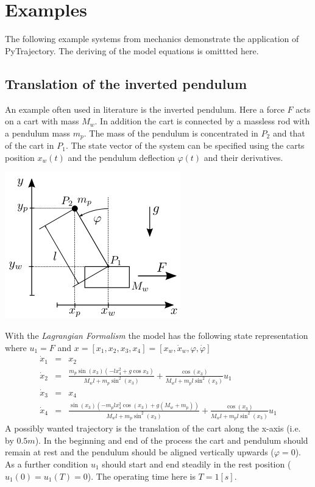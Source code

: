 \documentclass[letterpaper,10pt,english]{sphinxmanual}
\begin{document}
\section{Examples}
\label{guide/examples/index::doc}\label{guide/examples/index:examples}
The following example systems from mechanics demonstrate the application
of PyTrajectory. The deriving of the model equations is omittted here.


\subsection{Translation of the inverted pendulum}
\label{guide/examples/inv_pendulum_trans::doc}\label{guide/examples/inv_pendulum_trans:translation-of-the-inverted-pendulum}
An example often used in literature is the inverted pendulum. Here a
force \(F\) acts on a cart with mass \(M_w\). In addition the
cart is connected by a massless rod with a pendulum mass \(m_p\).
The mass of the pendulum is concentrated in \(P_2\) and that of the
cart in \(P_1\). The state vector of the system can be specified
using the carts position \(x_w(t)\) and the pendulum deflection
\(\varphi(t)\) and their derivatives.

\includegraphics{inv_pendulum.png}

With the \emph{Lagrangian Formalism} the model has the following state
representation where \(u_1 = F\) and
\(x = [x_1, x_2, x_3, x_4] = [x_w, \dot{x}_w, \varphi, \dot{\varphi}]\)
\begin{eqnarray*}
   \dot{x}_1 & = & x_2 \\
   \dot{x}_2 & = & \frac{m_p \sin(x_3)(-l x_4^2 + g \cos x_3)}{M_w l + m_p \sin^2(x_3)} + \frac{\cos(x_3)}{M_w l + m_p l \sin^2(x_3)} u_1 \\
   \dot{x}_3 & = & x_4 \\
   \dot{x}_4 & = & \frac{\sin(x_3)(-m_p l x_4^2 \cos(x_3) + g(M_w + m_p))}{M_w l + m_p \sin^2(x_3)} + \frac{\cos(x_3)}{M_w l + m_p l \sin^2(x_3)} u_1
\end{eqnarray*}
A possibly wanted trajectory is the translation of the cart along the
x-axis (i.e. by \(0.5m\)). In the beginning and end of the process
the cart and pendulum should remain at rest and the pendulum should be
aligned vertically upwards (\(\varphi = 0\)). As a further condition
\(u_1\) should start and end steadily in the rest position
(\(u_1(0) = u_1(T) = 0\)).
The operating time here is \(T = 1 [s]\).
\end{document}
